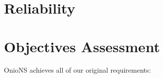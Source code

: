 \section{Reliability}







\section{Objectives Assessment}

OnioNS achieves all of our original requirements:

